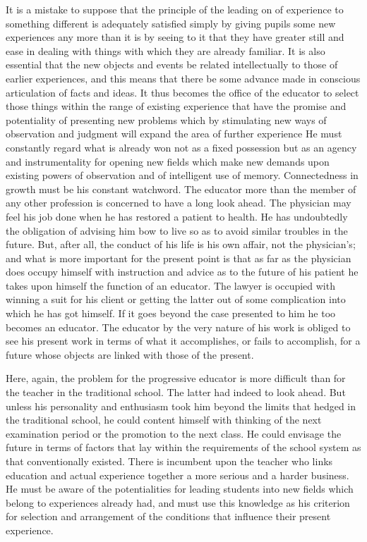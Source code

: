 It is a mistake to suppose that the principle of the leading on of experience to 
something different is adequately satisfied simply by giving pupils some new experiences 
any more than it is by seeing to it that they have greater still and ease in dealing with 
things with which they are already familiar. It is also essential that the new objects and 
events be related intellectually to those of earlier experiences, and this means that there 
be some advance made in conscious articulation of facts and ideas. It thus becomes the 
office of the educator to select those things within the range of existing experience that 
have the promise and potentiality of presenting new problems which by stimulating new 
ways of observation and judgment will expand the area of further experience He must 
constantly regard what is already won not as a fixed possession but as an agency and 
instrumentality for opening new fields which make new demands upon existing powers 
of observation and of intelligent use of memory. Connectedness in growth must be his 
constant watchword. The educator more than the member of any other profession is 
concerned to have a long look ahead. The physician may feel his job done when he has 
restored a patient to health. He has undoubtedly the obligation of advising him bow to 
live so as to avoid similar troubles in the future. But, after all, the conduct of his life is his own affair, not the physician's; and what is more important for the present point is that 
as far as the physician does occupy himself with instruction and advice as to the future of 
his patient he takes upon himself the function of an educator. The lawyer is occupied with 
winning a suit for his client or getting the latter out of some complication into which he 
has got himself. If it goes beyond the case presented to him he too becomes an educator. 
The educator by the very nature of his work is obliged to see his present work in terms of 
what it accomplishes, or fails to accomplish, for a future whose objects are linked with 
those of the present. 

Here, again, the problem for the progressive educator is more difficult than for the 
teacher in the traditional school. The latter had indeed to look ahead. But unless his 
personality and enthusiasm took him beyond the limits that hedged in the traditional school, he could content himself with thinking of the next examination period or the 
promotion to the next class. He could envisage the future in terms of factors that lay 
within the requirements of the school system as that conventionally existed. There is 
incumbent upon the teacher who links education and actual experience together a more 
serious and a harder business. He must be aware of the potentialities for leading students 
into new fields which belong to experiences already had, and must use this knowledge as 
his criterion for selection and arrangement of the conditions that influence their present 
experience. 


